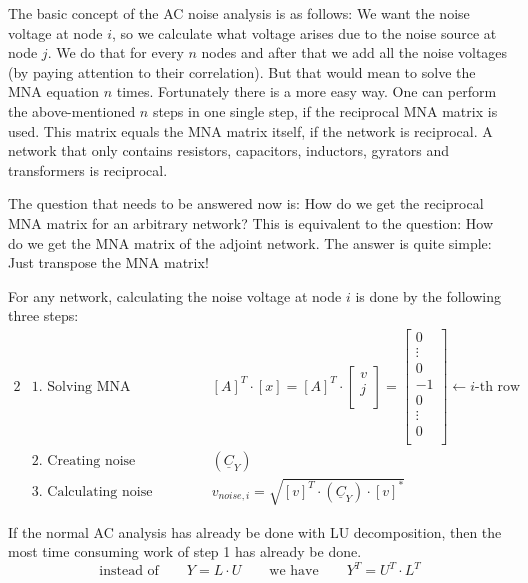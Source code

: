 \addvspace{12pt}

The basic concept of the AC noise analysis is as follows: We want the
noise voltage at node $i$, so we calculate what voltage arises due to
the noise source at node $j$.  We do that for every $n$ nodes and
after that we add all the noise voltages (by paying attention to their
correlation).  But that would mean to solve the MNA equation $n$
times.  Fortunately there is a more easy way.  One can perform the
above-mentioned $n$ steps in one single step, if the reciprocal MNA
matrix is used.  This matrix equals the MNA matrix itself, if the
network is reciprocal.  A network that only contains resistors,
capacitors, inductors, gyrators and transformers is reciprocal.

\addvspace{12pt}

The question that needs to be answered now is: How do we get the
reciprocal MNA matrix for an arbitrary network? This is equivalent to
the question: How do we get the MNA matrix of the adjoint network.
The answer is quite simple: Just transpose the MNA matrix!

\addvspace{12pt}

For any network, calculating the noise voltage at node $i$ is done by
the following three steps:
\begin{alignat}{2}
 & \textrm{1. Solving MNA equation:} & \qquad & \left[A\right]^T \cdot \left[x\right] =
\left[A\right]^T \cdot
\begin{bmatrix}
v \\
j \\
\end{bmatrix}
=
\begin{bmatrix}
0 \\
\vdots \\
0 \\
-1 \\
0 \\
\vdots \\
0 \\
\end{bmatrix}
\leftarrow i\textrm{-th row} \\
 & \textrm{2. Creating noise correlation matrix:} & \qquad
 & \left( \underline{C}_Y \right) \\
 & \textrm{3. Calculating noise voltage:} & \qquad
 & v_{noise,i} = \sqrt{\left[v\right]^T \cdot \left( \underline{C}_Y \right) \cdot \left[v\right]^*}
\end{alignat}

If the normal AC analysis has already be done with LU decomposition,
then the most time consuming work of step 1 has already be done.
\begin{equation}
\textrm{instead of} \qquad Y = L\cdot U \qquad \textrm{we have} \qquad
Y^T = U^T \cdot L^T
\end{equation}

